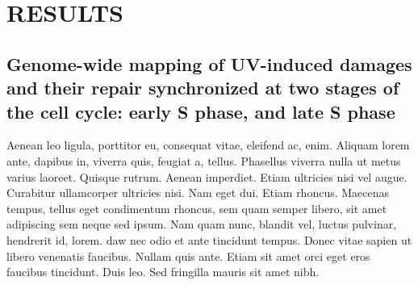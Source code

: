 \setlength{\parindent}{0pt}
\chapter{\bf RESULTS}

\section{Genome-wide mapping of UV-induced damages and their repair synchronized at two stages of the cell cycle: early S phase, and late S phase}

Aenean leo ligula, porttitor eu, consequat vitae, eleifend ac, enim. Aliquam lorem ante, dapibus in, viverra quis, feugiat a, tellus. Phasellus viverra nulla ut metus varius laoreet. Quisque rutrum. Aenean imperdiet. Etiam ultricies nisi vel augue. Curabitur ullamcorper ultricies nisi. Nam eget dui. Etiam rhoncus. Maecenas tempus, tellus eget condimentum rhoncus, sem quam semper libero, sit amet adipiscing sem neque sed ipsum. Nam quam nunc, blandit vel, luctus pulvinar, hendrerit id, lorem. \gls{daw} nec odio et ante tincidunt tempus. Donec vitae sapien ut libero venenatis faucibus. Nullam quis ante. Etiam sit amet orci eget eros faucibus tincidunt. Duis leo. Sed fringilla mauris sit amet nibh.

